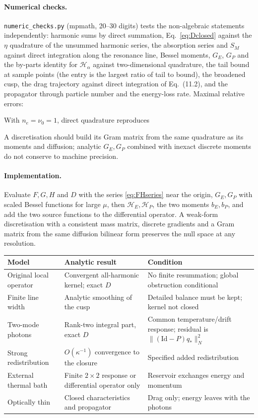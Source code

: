 \documentclass[11pt,a4paper]{article}
\numberwithin{equation}{section}
\newcommand{\sH}{\mathscr H}
\begin{document}
\paragraph{Numerical checks.} \texttt{numeric\_checks.py} (mpmath, 20--30 digits)
tests the non-algebraic statements independently: harmonic sums by direct
summation, Eq.~\eqref{eq:Dclosed} against the $\eta$ quadrature of the unsummed
harmonic series, the absorption series and $S_M$ against direct integration
along the resonance line, Bessel moments, $G_E$, $G_P$ and the by-parts
identity for $\sH_\alpha$ against two-dimensional quadrature, the tail bound at
sample points (the entry is the largest ratio of tail to bound), the broadened cusp,
the drag trajectory against direct integration of Eq.~(11.2), and the
propagator through particle number and the energy-loss rate. Maximal relative
errors:
\begin{center}

\end{center}
With $n_e=\nu_0=1$, direct quadrature reproduces
\begin{center}

\end{center}
A discretisation should build its Gram matrix from the same quadrature as its
moments and diffusion; analytic $G_E,G_P$ combined with inexact discrete
moments do not conserve to machine precision.

\paragraph{Implementation.} Evaluate $F,G,H$ and $D$ with the series
\eqref{eq:FHseries} near the origin, $G_E,G_P$ with scaled Bessel functions for
large $\mu$, then $\sH_E,\sH_P$, the two moments $b_E,b_P$, and add the two
source functions to the differential operator. A weak-form discretisation with
a consistent mass matrix, discrete gradients and a Gram matrix from the same
diffusion bilinear form preserves the null space at any resolution.

\begin{center}
\small
\begin{tabular}{p{3.4cm}p{4.7cm}p{5.6cm}}
\toprule
Model & Analytic result & Condition\\
\midrule
Original local operator & Convergent all-harmonic kernel; exact $D$ & No finite resummation; global obstruction conditional\\
Finite line width & Analytic smoothing of the cusp & Detailed balance must be kept; kernel not closed\\
Two-mode photons & Rank-two integral part, exact $D$ & Common temperature/drift response; residual is $\|(\mathrm{Id}-P)q_*\|_N^2$\\
Strong redistribution & $O(\kappa^{-1})$ convergence to the closure & Specified added redistribution\\
External thermal bath & Finite $2\times2$ response or differential operator only & Reservoir exchanges energy and momentum\\
Optically thin & Closed characteristics and propagator & Drag only; energy leaves with the photons\\
\bottomrule
\end{tabular}
\end{center}
\end{document}
